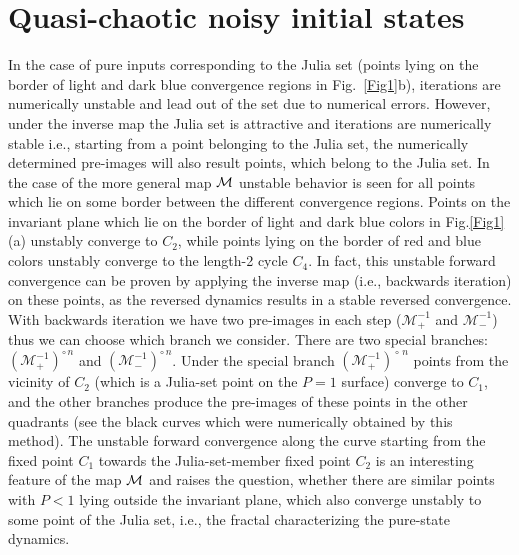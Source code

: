 \documentclass[%
 aip,
 amsmath,amssymb,
 reprint,%
]{revtex4-1}
\begin{document}
\section{Quasi-chaotic noisy initial states} 
In the case of pure inputs corresponding to the Julia set (points lying on the border of light and dark blue convergence regions in Fig.~\ref{Fig1}b), iterations are numerically unstable and lead out of the set due to numerical errors. However, under the inverse map the Julia set is attractive and iterations are numerically stable i.e., starting from a point belonging to the Julia set, the numerically determined pre-images will also result points, which belong to the Julia set. In the case of the more general map $\cal{M}$ unstable behavior is seen for all points which lie on some border between the different convergence regions. Points on the invariant plane which lie on the border of light and dark blue colors in Fig.\ref{Fig1}(a) unstably converge to $C_{2}$, while points lying on the border of red and blue colors unstably converge to the length-2 cycle $C_{4}$. In fact, this unstable forward convergence can be proven by applying the inverse map (i.e., backwards iteration) on these points, as the reversed dynamics results in a stable reversed convergence. With backwards iteration we have two pre-images in each step (${\mathcal M}^{-1}_{+}$ and ${\mathcal M}^{-1}_{-}$) thus we can choose which branch we consider\cite{Kalmanarxiv}. There are two special branches: $\left({\mathcal M}^{-1}_{+}\right)^{\circ \, n}$ and $\left({\mathcal M}^{-1}_{-}\right)^{\circ \, n}$. Under the special branch $\left({\mathcal M}^{-1}_{+}\right)^{\!\circ\, n}$ points from the vicinity of $C_{2}$ (which is a Julia-set point on the $P=1$ surface) converge to $C_{1}$, and the other branches produce the pre-images of these points in the other quadrants (see the black curves which were numerically obtained by this method). The unstable forward convergence along the curve starting from the fixed point $C_{1}$ towards the Julia-set-member fixed point $C_{2}$ is an interesting feature of the map $\cal{M}$ and raises the question, whether there are similar points  with $P<1$ lying outside the invariant plane, which also converge unstably to some point of the Julia set, i.e., the fractal characterizing the pure-state dynamics.
\end{document}
